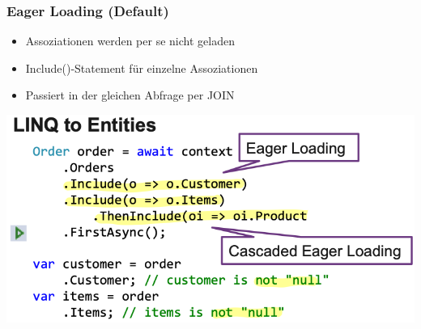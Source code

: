\subsubsection{Eager Loading (Default)}
\begin{itemize}
    \item Assoziationen werden per se nicht geladen
    \item Include()-Statement für einzelne Assoziationen
    \item Passiert in der gleichen Abfrage per JOIN
\end{itemize}
\vspace{-8pt}
\begin{center}
    \includegraphics[scale=.4]{graphic/efc/eager loading.png}
\end{center}
\vspace{-8pt}

